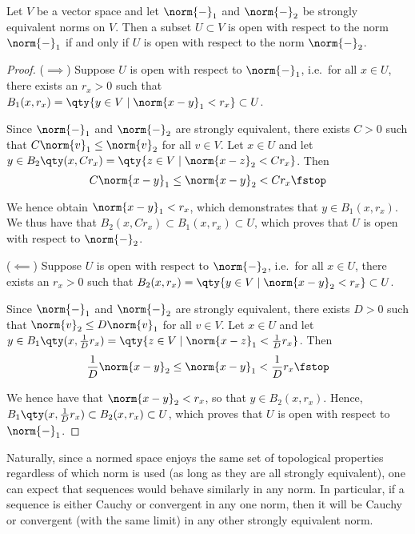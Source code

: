  \begin{proposition}
   Let \( V \) be a vector space and let \( \norm{-}_1 \) and \( \norm{-}_2 \) be strongly equivalent norms on \( V \). Then a subset \( U\subset V \) is open with respect to the norm \( \norm{-}_1 \) if and only if \( U \) is open with respect to the norm \( \norm{-}_2 \).
 \end{proposition}
 \begin{proof}
   (\( \implies \)) Suppose \( U \) is open with respect to \( \norm{-}_1 \), i.e.\ for all \( x\in U \), there exists an \( r_x>0 \) such that \( B_1(x,r_x)=\qty{y\in V\mid \norm{x-y}_1<r_x}\subset U \).

   \vspace{3mm}
   
   Since \( \norm{-}_1 \) and \( \norm{-}_2 \) are strongly equivalent, there exists \( C>0 \) such that \( C\norm{v}_1\leq\norm{v}_2 \) for all \( v\in V \). Let \( x\in U \) and let \( y\in B_2\qty(x,Cr_x)=\qty{z\in V\mid \norm{x-z}_2<Cr_x} \). Then
   \[ C\norm{x-y}_1\leq\norm{x-y}_2<Cr_x\fstop \]

   We hence obtain \( \norm{x-y}_1<r_x \), which demonstrates that \( y\in B_1(x,r_x) \). We thus have that \( B_2(x,Cr_x)\subset B_1(x,r_x)\subset U \), which proves that \( U \) is open with respect to \( \norm{-}_2 \).

   \vspace{3mm}

   (\( \impliedby \)) Suppose \( U \) is open with respect to \( \norm{-}_2 \), i.e.\ for all \( x\in U \), there exists an \( r_x>0 \) such that \( B_2(x,r_x)=\qty{y\in V\mid\norm{x-y}_2<r_x}\subset U \).

   \vspace{3mm}

   Since \( \norm{-}_1 \) and \( \norm{-}_2 \) are strongly equivalent, there exists \( D>0 \) such that \( \norm{v}_2\leq D\norm{v}_1 \) for all \( v\in V \). Let \( x\in U \) and let \( y\in B_1\qty(x,\frac{1}{D}r_x)=\qty{z\in V\mid \norm{x-z}_1<\frac{1}{D}r_x} \). Then
   \[ \frac{1}{D}\norm{x-y}_2\leq\norm{x-y}_1<\frac{1}{D}r_x\fstop \]

   We hence have that \( \norm{x-y}_2<r_x \), so that \( y\in B_2(x,r_x) \). Hence, \( B_1\qty(x,\frac{1}{D}r_x)\subset B_2(x,r_x)\subset U \), which proves that \( U \) is open with respect to \( \norm{-}_1 \).
 \end{proof}

 Naturally, since a normed space enjoys the same set of topological properties regardless of which norm is used (as long as they are all strongly equivalent), one can expect that sequences would behave similarly in any norm. In particular, if a sequence is either Cauchy or convergent in any one norm, then it will be Cauchy or convergent (with the same limit) in any other strongly equivalent norm.
 
